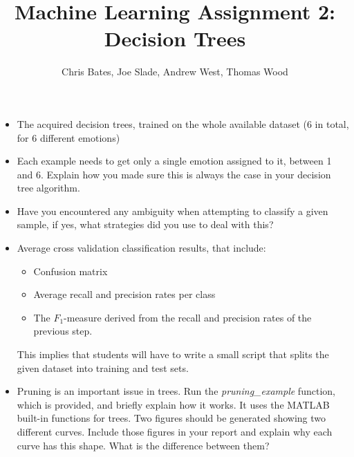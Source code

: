 \documentclass[a4paper]{article}
\title{Machine Learning Assignment 2: Decision Trees}
\author{Chris Bates, Joe Slade, Andrew West, Thomas Wood}
\begin{document}
\maketitle

\begin{itemize}
  \item The acquired decision trees, trained on the whole available dataset (6
    in total, for 6 different emotions)


  \item Each example needs to get only a single emotion assigned to it, between
    1 and 6. Explain how you made sure this is always the case in your decision
    tree algorithm.

  \item Have you encountered any ambiguity when attempting to classify a given
    sample, if yes, what strategies did you use to deal with this?

  \item Average cross validation classification results, that include:
    \begin{itemize}
      \item Confusion matrix
      \item Average recall and precision rates per class
      \item The $F_1$-measure derived from the recall and precision rates of the
        previous step.
    \end{itemize}
    This implies that students will have to write a small script that splits the
    given dataset into training and test sets.

  \item Pruning is an important issue in trees. Run the \emph{pruning\_example}
    function, which is provided, and briefly explain how it works. It uses the
    MATLAB built-in functions for trees. Two figures should be generated showing
    two different curves. Include those figures in your report and explain why
    each curve has this shape. What is the difference between them?
\end{itemize}
\end{document}
